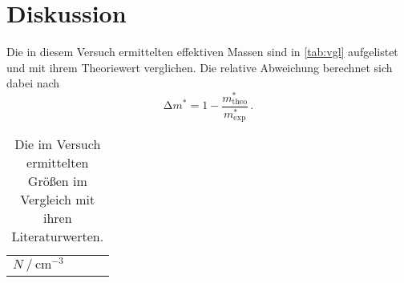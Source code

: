 \newpage
\section{Diskussion}

\noindent Die in diesem Versuch ermittelten effektiven Massen sind in \autoref{tab:vgl} aufgelistet und mit ihrem Theoriewert verglichen. 
Die relative Abweichung berechnet sich dabei nach
\begin{equation*}
    \increment m^* = 1 - \frac{m^*_\text{theo}}{m^*_\text{exp}} \, .
\end{equation*}

\begin{table}
    \centering
    \caption{Die im Versuch ermittelten Größen im Vergleich mit ihren Literaturwerten.}
    \label{tab:vgl}
    \begin{tabular}{c c c c}
        \toprule
        {$N \mathbin{/} \si{\centi\metre\tothe{-3}}$} & {} 
    \end{tabular}
\end{table}

